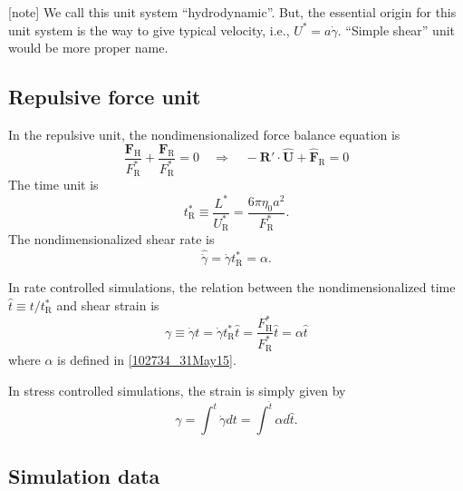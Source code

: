 \documentclass[fontsize=11pt]{scrartcl}
\begin{document}
[note]
We call this unit system ``hydrodynamic''.
But, the essential origin for this unit system
is the way to give typical velocity,
i.e., $U^{\ast} = a \dot{\gamma}$.
%
``Simple shear'' unit would be more proper name.


\subsection*{Repulsive force unit}

In the repulsive unit,
the nondimensionalized
force balance equation is
\begin{equation}
 \frac{\bm{F}_{\mathrm{H}}}{F^{\ast}_{\mathrm{R}}}
  +
  \frac{\bm{F}_{\mathrm{R}}}{F^{\ast}_{\mathrm{R}}}  = 0
      \quad
  \Longrightarrow
    \quad
    - \bm{R}' \cdot \hat{\bm{U}} +
    \hat{\bm{F}}_{\mathrm{R}} = 0
\end{equation}
The time unit is
\begin{equation}
 t_{\mathrm{R}}^{\ast}
  \equiv \frac{L^{\ast}}{U_{\mathrm{R}}^{\ast}}
  = \frac{6 \pi \eta_0 a^2}{F_{\mathrm{R}}^{\ast}}.
\end{equation}
%
The nondimensionalized shear rate is
\begin{equation}
 \hat{\dot{\gamma}} =
  \dot{\gamma} t_{\mathrm{R}}^{\ast}
  = \alpha.
\end{equation}



In rate controlled simulations,
the relation between
the nondimensionalized time
$\hat{t} \equiv t /t_{\mathrm{R}}^{\ast}$
and shear strain is
\begin{equation}
 \gamma
  \equiv \dot{\gamma} t 
  = \dot{\gamma} t_{\mathrm{R}}^{\ast} \hat{t} 
   = 
\frac{F_{\mathrm{H}}^{\ast}}{F_{\mathrm{R}}^{\ast}}
\hat{t} = \alpha \hat{t}
\end{equation}
where $\alpha$ is defined in \eqref{102734_31May15}.

In stress controlled simulations,
the strain is simply given by
\begin{equation}
 \gamma
 = \int^{t} \dot{\gamma} dt
 = \int^{\hat{t}} \alpha d\hat{t}.
\end{equation}



\subsection*{Simulation data}
\end{document}
